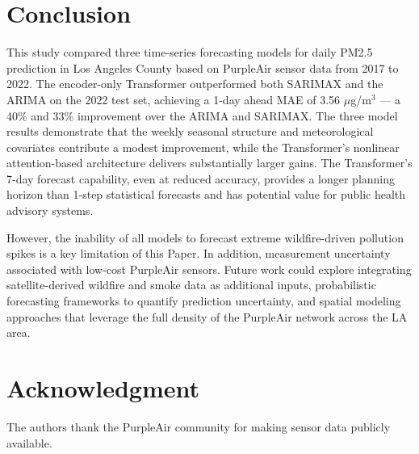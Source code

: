 \documentclass[conference]{IEEEtran}
\begin{document}
\section{Conclusion}



This study compared three time-series forecasting models for daily PM2.5 prediction in Los Angeles County based on PurpleAir sensor data from 2017 to 2022. The encoder-only Transformer outperformed both SARIMAX and the ARIMA on the 2022 test set, achieving a 1-day ahead MAE of 3.56 $\mu$g/m$^3$ — a 40\%  and 33\% improvement over the ARIMA and SARIMAX. The three model results demonstrate that the weekly seasonal structure and meteorological covariates contribute a modest improvement, while the Transformer’s nonlinear attention-based architecture delivers substantially larger gains. The Transformer's 7-day forecast capability, even at reduced accuracy, provides a longer planning horizon than 1-step statistical forecasts and has potential value for public health advisory systems.

However, the inability of all models to forecast extreme wildfire-driven pollution spikes is a key limitation of this Paper. In addition,  measurement uncertainty associated with low-cost PurpleAir sensors.  Future work could explore integrating satellite-derived wildfire and smoke data as additional inputs, probabilistic forecasting frameworks to quantify prediction uncertainty, and spatial modeling approaches that leverage the full density of the PurpleAir network across the LA area.



\section*{Acknowledgment}
The authors thank the PurpleAir community for making sensor data publicly available.
\end{document}
